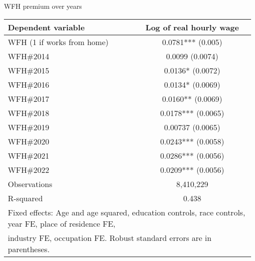 \documentclass[aspectratio=1610]{beamer}
\begin{document}
\begin{frame}[label = wfhyears_appendix]{WFH premium over years}
\small

\begin{table}[htbp]\centering
\footnotesize
\begin{tabular}{lc}
\toprule
\hline
Dependent variable & Log of real hourly wage \\
\hline
WFH (1 if works from home)       & 0.0781***  (0.005)  \\
WFH\#2014 & 0.0099 (0.0074)  \\
WFH\#2015 & 0.0136* (0.0072)  \\
WFH\#2016 & 0.0134* (0.0069)  \\
WFH\#2017 & 0.0160**  (0.0069)  \\
WFH\#2018 & 0.0178*** (0.0065)  \\
WFH\#2019 & 0.00737  (0.0065)  \\
WFH\#2020 & 0.0243***  (0.0058)  \\
WFH\#2021 & 0.0286*** (0.0056)  \\
WFH\#2022 & 0.0209*** (0.0056)  \\
\hline 
Observations            & 8,410,229 \\
R-squared               & 0.438     \\
\hline 
\bottomrule
\multicolumn{2}{l}{\footnotesize{Fixed effects: Age and age squared,
education controls,
race controls, year FE,
place of residence FE,}}\\
\multicolumn{2}{l}{\footnotesize{industry FE, 
occupation FE. Robust standard errors are in parentheses.}}\\
\end{tabular}
\end{table}
\hyperlink{wfhyears_main}{}  

\end{frame}
\end{document}
